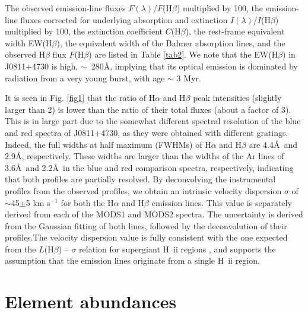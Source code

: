 \documentclass[useAMS,usenatbib]{mn2e}
\begin{document}
The observed emission-line fluxes $F(\lambda)$/$F$(H$\beta$) multiplied by 100, 
the emission-line fluxes corrected for underlying absorption and extinction $I(\lambda)$/$I$(H$\beta$) multiplied by 100, the extinction 
coefficient $C$(H$\beta$), the rest-frame equivalent width EW(H$\beta$),
the equivalent width of the Balmer absorption lines, and the observed
H$\beta$ flux $F$(H$\beta$) are listed in Table \ref{tab2}. We note that 
the EW(H$\beta$) in J0811$+$4730 is high, $\sim$~280\AA, implying that 
its optical emission is dominated by radiation from a very young burst, with
age $\sim$ 3 Myr.

It is seen in Fig. \ref{fig1} that the ratio of H$\alpha$ and H$\beta$
peak intensities (slightly larger than 2) is lower than the ratio of their 
total fluxes (about a factor of 3). This is in large
part due to the somewhat different spectral resolution of the blue and red 
spectra of J0811$+$4730, as they were obtained with different gratings.
Indeed, the full widths at half maximum (FWHMs) of H$\alpha$ and H$\beta$ are 
4.4\AA\ and 2.9\AA, respectively. These widths are larger than the widths of 
the Ar lines of 3.6\AA\ and 2.2\AA\ in the blue and red comparison spectra,
respectively, indicating that both profiles are 
partially resolved. By deconvolving the instrumental profiles from the  
observed profiles, we obtain an intrinsic 
velocity dispersion $\sigma$ of $\sim$45$\pm$5 km s$^{-1}$ for both the 
H$\alpha$ and H$\beta$ emission lines. This value is separately derived from each of the MODS1 and MODS2 spectra. The uncertainty is derived from the Gaussian fitting of both lines, followed by
the deconvolution of their profiles.The velocity dispersion value is fully consistent with the one expected from the $L$(H$\beta$) --
$\sigma$ relation for supergiant H~{\sc ii} regions \citep[e.g. ][]{C12}, 
and supports the assumption that the emission lines originate from a single 
H~{\sc ii} region. 

\section{Element abundances}\label{sec:abundances}
\end{document}
